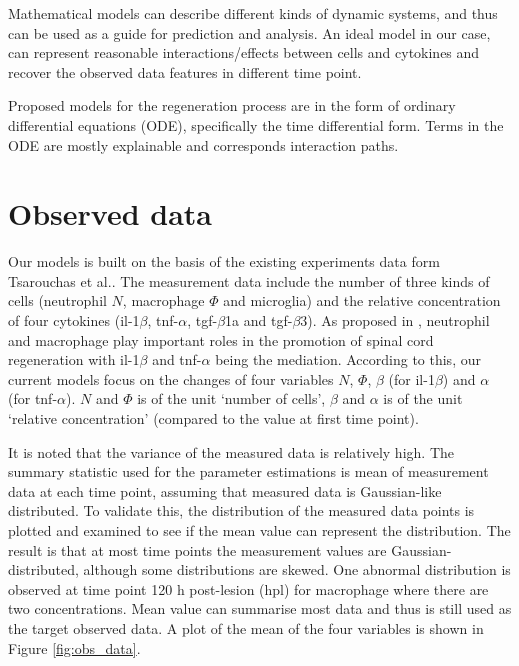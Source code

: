 \documentclass[12pt,a4paper]{report}
\begin{document}
Mathematical models can describe different kinds of dynamic systems, and thus can be used as a guide for prediction and analysis. An ideal model in our case, can represent reasonable interactions/effects between cells and cytokines and recover the observed  data features in different time point.

Proposed models for the regeneration process are in the form of ordinary differential equations (ODE), specifically the time differential form. Terms in the ODE are mostly explainable and corresponds interaction paths.

\section{Observed data}

Our models is built on the basis of the existing experiments data form Tsarouchas et al.\cite{ref:Tsarouchas}. The measurement data include the number of three kinds of cells (neutrophil $N$, macrophage $\Phi$ and microglia) and the relative concentration of four cytokines (il-1$\beta$, tnf-$\alpha$, tgf-$\beta$1a and tgf-$\beta$3). As proposed in \cite{ref:Tsarouchas}, neutrophil and macrophage play important roles in the promotion of spinal cord regeneration with il-1$\beta$ and tnf-$\alpha$ being the mediation. According to this, our current models focus on the changes of four variables $N$, $\Phi $, $\beta$ (for il-1$\beta$) and $\alpha$ (for tnf-$\alpha$). $N$ and $\Phi$ is of the unit `number of cells', $\beta$ and $\alpha$ is of the unit `relative concentration' (compared to the value at first time point).

It is noted that the variance of the measured data is relatively high. The summary statistic used for the parameter estimations is mean of measurement data at each time point, assuming that measured data is Gaussian-like distributed. To validate this, the distribution of the measured data points is plotted and examined to see if the mean value can represent the distribution. The result is that at most time points the measurement values are Gaussian-distributed, although some distributions are skewed. One abnormal distribution is observed at time point 120 h post-lesion (hpl) for macrophage where there are two concentrations. Mean value can summarise most data and thus is still used as the target observed data. A plot of the mean of the four variables is shown in Figure \ref{fig:obs_data}.
\end{document}
